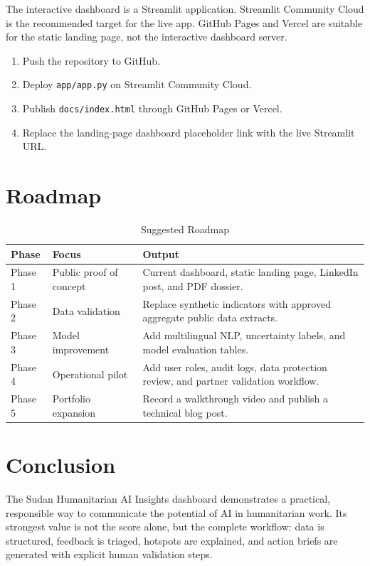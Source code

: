 \documentclass[11pt,a4paper]{article}
\begin{document}
The interactive dashboard is a Streamlit application. Streamlit Community Cloud is the recommended target for the live app. GitHub Pages and Vercel are suitable for the static landing page, not the interactive dashboard server.

\begin{enumerate}
  \item Push the repository to GitHub.
  \item Deploy \texttt{app/app.py} on Streamlit Community Cloud.
  \item Publish \texttt{docs/index.html} through GitHub Pages or Vercel.
  \item Replace the landing-page dashboard placeholder link with the live Streamlit URL.
\end{enumerate}

\section{Roadmap}

\begin{table}[H]
\centering
\caption{Suggested Roadmap}
\begin{tabularx}{\textwidth}{p{}p{}Y}
\toprule
\textbf{Phase} & \textbf{Focus} & \textbf{Output} \\
\midrule
Phase 1 & Public proof of concept & Current dashboard, static landing page, LinkedIn post, and PDF dossier. \\
Phase 2 & Data validation & Replace synthetic indicators with approved aggregate public data extracts. \\
Phase 3 & Model improvement & Add multilingual NLP, uncertainty labels, and model evaluation tables. \\
Phase 4 & Operational pilot & Add user roles, audit logs, data protection review, and partner validation workflow. \\
Phase 5 & Portfolio expansion & Record a walkthrough video and publish a technical blog post. \\
\bottomrule
\end{tabularx}
\end{table}

\section{Conclusion}

The Sudan Humanitarian AI Insights dashboard demonstrates a practical, responsible way to communicate the potential of AI in humanitarian work. Its strongest value is not the score alone, but the complete workflow: data is structured, feedback is triaged, hotspots are explained, and action briefs are generated with explicit human validation steps.
\end{document}
